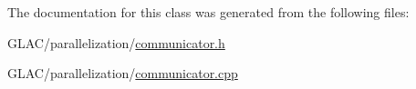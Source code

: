 The documentation for this class was generated from the following files\+:\begin{DoxyCompactItemize}
\item 
G\+L\+A\+C/parallelization/\mbox{\hyperlink{communicator_8h}{communicator.\+h}}\item 
G\+L\+A\+C/parallelization/\mbox{\hyperlink{communicator_8cpp}{communicator.\+cpp}}\end{DoxyCompactItemize}
